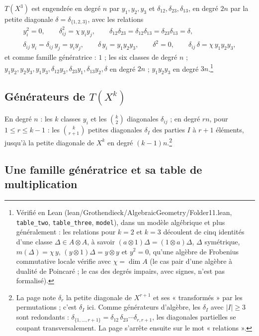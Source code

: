 \documentclass[11pt,a4paper]{article}
\begin{document}
$T(X^{3})$ est engendrée en degré $n$ par $y_{1}, y_{2}, y_{3}$ et
$\delta_{12}, \delta_{23}, \delta_{13}$, en degré $2n$ par la petite
diagonale $\delta = \delta_{\{1,2,3\}}$, avec les relations
\[
\begin{gathered}
y_{i}^{2} = 0 , \qquad \delta_{ij}^{2} = \chi\, y_{i}y_{j} , \qquad \delta_{12}\delta_{23} = \delta_{12}\delta_{13} = \delta_{23}\delta_{13} = \delta , \\
\delta_{ij}\, y_{i} = \delta_{ij}\, y_{j} = y_{i}y_{j} , \qquad \delta\, y_{i} = y_{1}y_{2}y_{3} , \qquad \delta^{2} = 0 , \qquad \delta_{ij}\,\delta = \chi\, y_{1}y_{2}y_{3} ,
\end{gathered}
\]
et comme famille génératrice : $1$ ; les six classes de degré $n$ ;
$y_{1}y_{2}, y_{2}y_{3}, y_{1}y_{3}, \delta_{12}y_{3}, \delta_{23}y_{1}, \delta_{13}y_{2}, \delta$
en degré $2n$ ; $y_{1}y_{2}y_{3}$ en degré $3n$.\footnote{Vérifié en Lean
(lean/Grothendieck/AlgebraicGeometry/Folder11.lean, \texttt{table\_two}, \texttt{table\_three},
\texttt{model}), dans un modèle algébrique et plus généralement : les relations
pour $k = 2$ et $k = 3$ découlent de cinq identités d'une classe
$\Delta \in A \otimes A$, à savoir $(a \otimes 1)\Delta = (1 \otimes a)\Delta$,
$\Delta$ symétrique, $m(\Delta) = \chi\, y$, $(y \otimes 1)\Delta = y \otimes
y$ et $y^{2} = 0$, qu'une algèbre de Frobenius commutative locale vérifie avec
$\chi = \dim A$ (le cas pair d'une algèbre à dualité de Poincaré ; le cas des
degrés impairs, avec signes, n'est pas formalisé).}

\subsection*{Générateurs de $T(X^{k})$}

En degré $n$ : les $k$ classes $y_{i}$ et les $\binom{k}{2}$ diagonales
$\delta_{ij}$ ; en degré $rn$, pour $1 \leq r \leq k-1$ : les
$\binom{k}{r+1}$ petites diagonales $\delta_{I}$ des parties $I$ à $r+1$
éléments, jusqu'à la petite diagonale de $X^{k}$ en degré
$(k-1)n$.\footnote{La page note $\delta_{r}$ la petite diagonale de $X^{r+1}$
et ses « transformés » par les permutations ; c'est $\delta_{I}$ ici. Comme
générateurs d'algèbre, les $\delta_{I}$ avec $|I| \geq 3$ sont redondants :
$\delta_{\{1, \ldots, r+1\}} = \delta_{12}\,\delta_{23} \cdots \delta_{r,r+1}$,
les diagonales partielles se coupant transversalement. La page s'arrête
ensuite sur le mot « relations ».}

\subsection*{Une famille génératrice et sa table de multiplication}
\end{document}
